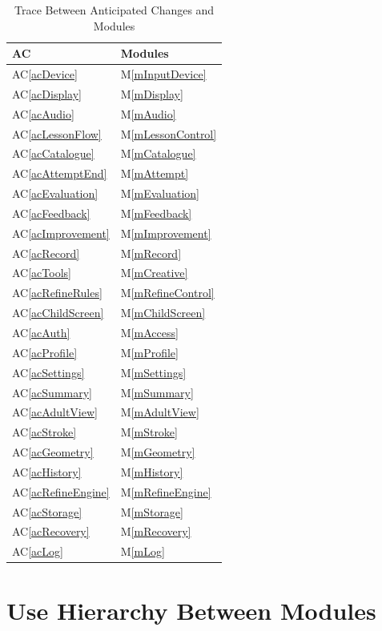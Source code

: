 \documentclass[12pt, titlepage]{article}
\newcommand{\acref}[1]{AC\ref{#1}}
\newcommand{\mref}[1]{M\ref{#1}}
\begin{document}
\begin{table}[H]
\centering
\begin{tabular}{p{} p{}}
\toprule
\textbf{AC} & \textbf{Modules}\\
\midrule
\acref{acDevice} & \mref{mInputDevice}\\
\acref{acDisplay} & \mref{mDisplay}\\
\acref{acAudio} & \mref{mAudio}\\
\acref{acLessonFlow} & \mref{mLessonControl}\\
\acref{acCatalogue} & \mref{mCatalogue}\\
\acref{acAttemptEnd} & \mref{mAttempt}\\
\acref{acEvaluation} & \mref{mEvaluation}\\
\acref{acFeedback} & \mref{mFeedback}\\
\acref{acImprovement} & \mref{mImprovement}\\
\acref{acRecord} & \mref{mRecord}\\
\acref{acTools} & \mref{mCreative}\\
\acref{acRefineRules} & \mref{mRefineControl}\\
\acref{acChildScreen} & \mref{mChildScreen}\\
\acref{acAuth} & \mref{mAccess}\\
\acref{acProfile} & \mref{mProfile}\\
\acref{acSettings} & \mref{mSettings}\\
\acref{acSummary} & \mref{mSummary}\\
\acref{acAdultView} & \mref{mAdultView}\\
\acref{acStroke} & \mref{mStroke}\\
\acref{acGeometry} & \mref{mGeometry}\\
\acref{acHistory} & \mref{mHistory}\\
\acref{acRefineEngine} & \mref{mRefineEngine}\\
\acref{acStorage} & \mref{mStorage}\\
\acref{acRecovery} & \mref{mRecovery}\\
\acref{acLog} & \mref{mLog}\\
\bottomrule
\end{tabular}
\caption{Trace Between Anticipated Changes and Modules}
\label{TblACT}
\end{table}

\section{Use Hierarchy Between Modules} \label{SecUse}
\end{document}
